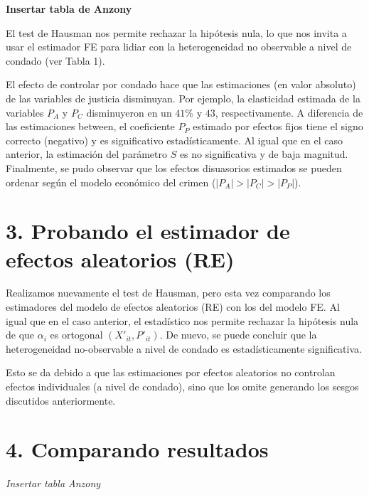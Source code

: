 \documentclass[
]{article}
\begin{document}
\textbf{Insertar tabla de Anzony}

El test de Hausman nos permite rechazar la hipótesis nula, lo que nos
invita a usar el estimador FE para lidiar con la heterogeneidad no
observable a nivel de condado (ver Tabla 1).

El efecto de controlar por condado hace que las estimaciones (en valor
absoluto) de las variables de justicia disminuyan. Por ejemplo, la
elasticidad estimada de la variables \(P_A\) y \(P_C\) disminuyeron en
un \(41\%\) y \(43%
\), respectivamente. A diferencia de las estimaciones between, el
coeficiente \(P_P\) estimado por efectos fijos tiene el signo correcto
(negativo) y es significativo estadísticamente. Al igual que en el caso
anterior, la estimación del parámetro \(S\) es no significativa y de
baja magnitud. Finalmente, se pudo observar que los efectos disuasorios
estimados se pueden ordenar según el modelo económico del crimen
(\(|P_A|>|P_C|>|P_P|\)).

\hypertarget{probando-el-estimador-de-efectos-aleatorios-re}{%
\section{3. Probando el estimador de efectos aleatorios
(RE)}\label{probando-el-estimador-de-efectos-aleatorios-re}}

Realizamos nuevamente el test de Hausman, pero esta vez comparando los
estimadores del modelo de efectos aleatorios (RE) con los del modelo FE.
Al igual que en el caso anterior, el estadístico nos permite rechazar la
hipótesis nula de que \(\alpha_i\) es ortogonal \((X'_{it},P'_{it})\).
De nuevo, se puede concluir que la heterogeneidad no-observable a nivel
de condado es estadísticamente significativa.

Esto se da debido a que las estimaciones por efectos aleatorios no
controlan efectos individuales (a nivel de condado), sino que los omite
generando los sesgos discutidos anteriormente.

\hypertarget{comparando-resultados}{%
\section{4. Comparando resultados}\label{comparando-resultados}}

\emph{Insertar tabla Anzony}
\end{document}
